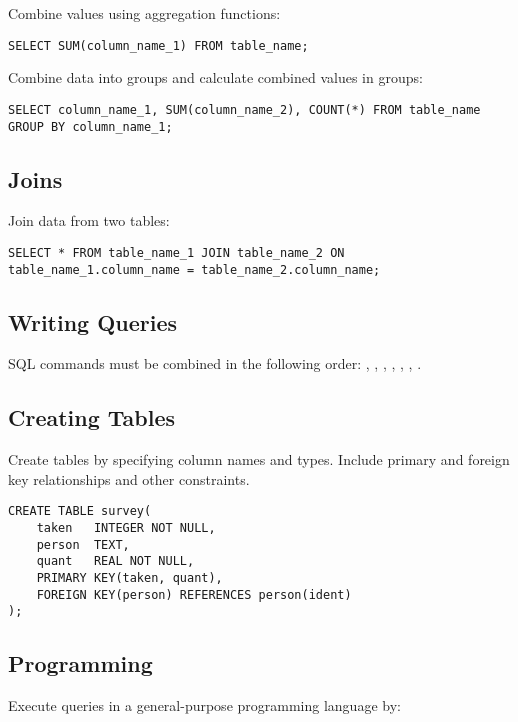 Combine values using aggregation functions:

\begin{Verbatim}
SELECT SUM(column_name_1) FROM table_name;
\end{Verbatim}

Combine data into groups and calculate combined values in groups:

\begin{Verbatim}
SELECT column_name_1, SUM(column_name_2), COUNT(*) FROM table_name GROUP BY column_name_1;
\end{Verbatim}

\subsection*{Joins}

Join data from two tables:

\begin{Verbatim}
SELECT * FROM table_name_1 JOIN table_name_2 ON table_name_1.column_name = table_name_2.column_name;
\end{Verbatim}

\subsection*{Writing Queries}

SQL commands must be combined in the following order: ,
, , , ,
, .

\subsection*{Creating Tables}

Create tables by specifying column names and types. Include primary and
foreign key relationships and other constraints.

\begin{Verbatim}
CREATE TABLE survey(
    taken   INTEGER NOT NULL,
    person  TEXT,
    quant   REAL NOT NULL,
    PRIMARY KEY(taken, quant),
    FOREIGN KEY(person) REFERENCES person(ident)
);
\end{Verbatim}

\subsection*{Programming}

Execute queries in a general-purpose programming language by:

